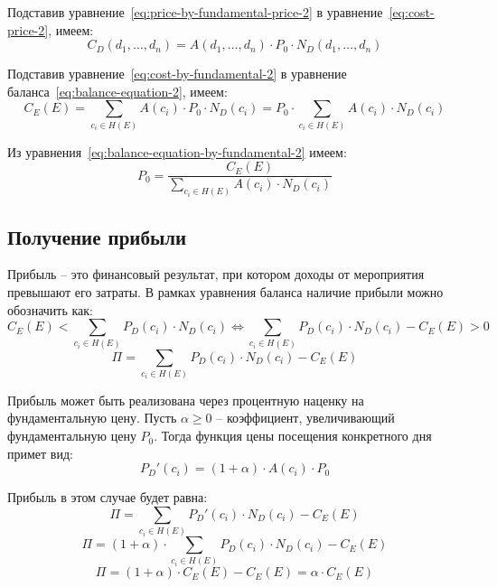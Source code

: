 Подставив уравнение~\ref{eq:price-by-fundamental-price-2} в уравнение~\ref{eq:cost-price-2}, имеем:
\begin{equation}
	C_D(d_1, \dots, d_n) = A(d_1, \dots, d_n) \cdot P_0 \cdot N_D(d_1, \dots, d_n)
	\label{eq:cost-by-fundamental-2}
\end{equation}

Подставив уравнение~\ref{eq:cost-by-fundamental-2} в уравнение баланса~\ref{eq:balance-equation-2}, имеем:
\begin{equation}
	C_E(E) = \sum_{c_i \in H(E)}{A(c_i) \cdot P_0 \cdot N_D(c_i)} = P_0 \cdot \sum_{c_i \in H(E)}{A(c_i) \cdot N_D(c_i)}
	\label{eq:balance-equation-by-fundamental-2}
\end{equation}

Из уравнения~\ref{eq:balance-equation-by-fundamental-2} имеем:
\begin{equation}
	P_0 = \frac{C_E(E)}{\sum_{c_i \in H(E)}{A(c_i) \cdot N_D(c_i)}}
	\label{eq:fundamental-price-2}
\end{equation}

\subsection{Получение прибыли}

Прибыль -- это финансовый результат, при котором доходы от мероприятия превышают его затраты. В рамках уравнения баланса наличие прибыли можно обозначить как:
\begin{equation}
	C_E(E) < \sum_{c_i \in H(E)}{P_D(c_i) \cdot N_D(c_i)} \Leftrightarrow \sum_{c_i \in H(E)}{P_D(c_i) \cdot N_D(c_i)} - C_E(E) > 0
\end{equation}
\begin{equation}
	\Pi = \sum_{c_i \in H(E)}{P_D(c_i) \cdot N_D(c_i)} - C_E(E)
\end{equation}

Прибыль может быть реализована через процентную наценку на фундаментальную цену. Пусть $\alpha \ge 0$ -- коэффициент, увеличивающий фундаментальную цену $P_0$. Тогда функция цены посещения конкретного дня примет вид:
\begin{equation}
	P_D'(c_i) = (1 + \alpha) \cdot A(c_i) \cdot P_0
\end{equation}

Прибыль в этом случае будет равна:
\begin{equation}
	\Pi = \sum_{c_i \in H(E)}{P_D'(c_i) \cdot N_D(c_i)} - C_E(E) 
\end{equation}
\begin{equation}
	\Pi = (1 + \alpha) \cdot \sum_{c_i \in H(E)}{P_D(c_i) \cdot N_D(c_i)} - C_E(E)
\end{equation}
\begin{equation}
	\Pi = (1 + \alpha) \cdot C_E(E) - C_E(E) = \alpha \cdot C_E(E)
\end{equation}

